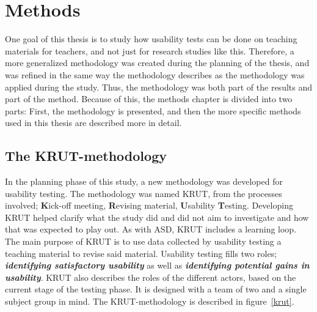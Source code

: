 
%
%

\chapter{Methods} \vspace{-0.6cm}
One goal of this thesis is to study how usability tests can be done on teaching materials for teachers, and not just for research studies like this. Therefore, a more generalized methodology was created during the planning of the thesis, and was refined in the same way the methodology describes as the methodology was applied during the study. Thus, the methodology was both part of the results and part of the method. Because of this, the methods chapter is divided into two parts: First, the methodology is presented, and then the more specific methods used in this thesis are described more in detail.

\section{The KRUT-methodology}
In the planning phase of this study, a new methodology was developed for usability testing. The methodology was named KRUT, from the processes involved; \textbf{K}ick-off meeting, \textbf{R}evising material, \textbf{U}sability \textbf{T}esting. Developing KRUT helped clarify what the study did and did not aim to investigate and how that was expected to play out. As with ASD, KRUT includes a learning loop. The main purpose of KRUT is to use data collected by usability testing a teaching material to revise said material. Usability testing fills two roles; \textbf{\textit{identifying satisfactory usability}} as well as \textbf{\textit{identifying potential gains in usability}}. KRUT also describes the roles of the different actors, based on the current stage of the testing phase. It is designed with a team of two and a single subject group in mind. The KRUT-methodology is described in figure~\ref{krut}.

